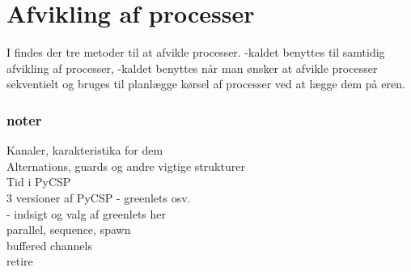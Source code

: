 \section{Afvikling af processer}
I \pycsp findes der tre metoder til at afvikle processer. -kaldet benyttes til samtidig afvikling af processer, -kaldet benyttes når man ønsker at afvikle processer sekventielt og  bruges til planlægge kørsel af processer ved at lægge dem på \sched eren. 


\subsubsection{noter}
Kanaler, karakteristika for dem\\
Alternations, guards og andre vigtige strukturer\\
Tid i PyCSP\\

3 versioner af PyCSP - greenlets osv.\\
 - indsigt og valg af greenlets her\\

parallel, sequence, spawn\\
buffered channels\\
retire\\





